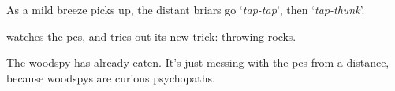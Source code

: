 \begin{boxtext}
  As a mild breeze picks up, the distant briars go `\textit{tap-tap}', then `\textit{tap-thunk}'.
\end{boxtext}

 watches the \glspl{pc}, and tries out its new trick: throwing rocks.

The \gls{woodspy} has already eaten.
It's just messing with the \glspl{pc} from a distance, because \glspl{woodspy} are curious psychopaths.

\woodspy
